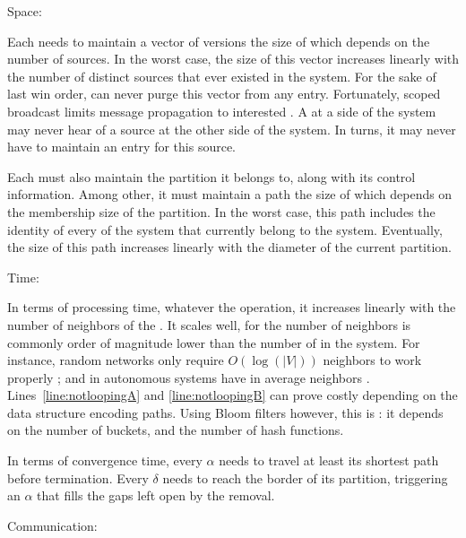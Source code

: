 \begin{asparadesc}
\item [Space:]

Each \process needs to maintain a vector of versions the size of which
depends on the number of sources. In the worst case, the size of this
vector increases linearly with the number of distinct sources that
ever existed in the system. For the sake of last win order, \processes
can never purge this vector from any entry.  Fortunately, scoped broadcast limits
message propagation to interested \processes. A \process at a side of
the system may never hear of a source at the other side of the
system. In turns, it may never have to maintain an entry for this
source. 

\noindent Each \process must also maintain the partition it belongs to,
along with its control information. Among other, it must maintain a
path the size of which depends on the membership size of the
partition. In the worst case, this path includes the identity of every
\process of the system that currently belong to the system. Eventually,
the size of this path increases linearly with the diameter of the
current partition. 

\item[Time:]
  
In terms of processing time, whatever the operation, it increases
linearly with the number of neighbors of the \process. It scales well,
for the number of neighbors is commonly order of magnitude lower than
the number of \processes in the system. For instance, random networks
only require $O(\log(|V|))$ neighbors to work properly \REF; and
\processes in autonomous systems have in average  neighbors
\REF. Lines~\ref{line:notloopingA} and \ref{line:notloopingB} can
prove costly depending on the data structure encoding paths. Using
Bloom filters however, this is : it depends on the
number of buckets, and the number of hash functions.

\noindent In terms of convergence time, every $\alpha$ needs to travel
at least its shortest path before termination. Every $\delta$ needs to
reach the border of its partition, triggering an $\alpha$ that fills
the gaps left open by the removal. 

\item[Communication:]
  

\end{asparadesc}
